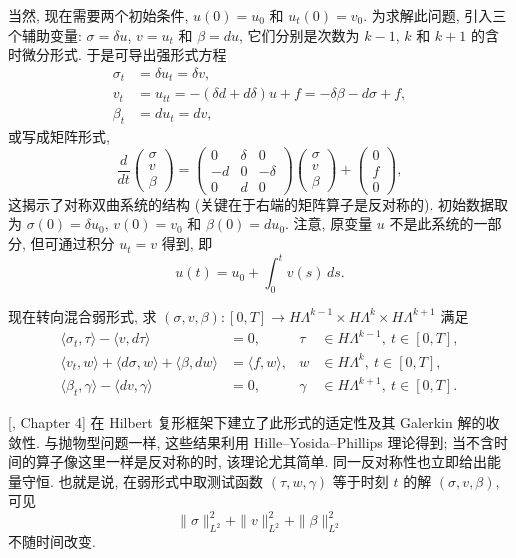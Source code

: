 当然, 现在需要两个初始条件, $u(0)=u_0$ 和 $u_t(0)=v_0$. 为求解此问题, 引入三个辅助变量: $\sigma=\delta u$, $v=u_t$ 和 $\beta=du$, 它们分别是次数为 $k-1$, $k$ 和 $k+1$ 的含时微分形式. 于是可导出强形式方程
\[
\begin{aligned}
\sigma_t&=\delta u_t=\delta v,\\
v_t&=u_{tt}=-(\delta d+d\delta)u+f=-\delta\beta-d\sigma+f,\\
\beta_t&=du_t=dv,
\end{aligned}
\]
或写成矩阵形式,
\[
\frac d{dt}\begin{pmatrix}\sigma\\v\\\beta\end{pmatrix}=
\begin{pmatrix}0&\delta&0\\-d&0&-\delta\\0&d&0\end{pmatrix}
\begin{pmatrix}\sigma\\v\\\beta\end{pmatrix}+\begin{pmatrix}0\\f\\0\end{pmatrix},
\]
这揭示了对称双曲系统的结构 (关键在于右端的矩阵算子是反对称的). 初始数据取为 $\sigma(0)=\delta u_0$, $v(0)=v_0$ 和 $\beta(0)=du_0$. 注意, 原变量 $u$ 不是此系统的一部分, 但可通过积分 $u_t=v$ 得到, 即
\[
u(t)=u_0+\int_0^t v(s)\,ds.
\]

现在转向混合弱形式, 求 $(\sigma,v,\beta):[0,T]\to H\Lambda^{k-1}\times H\Lambda^k\times H\Lambda^{k+1}$ 满足
\begin{equation}\label{eq:hodge-wave-weak-formulation}
\begin{aligned}
\langle\sigma_t,\tau\rangle-\langle v,d\tau\rangle&=0,&\tau&\in H\Lambda^{k-1},\ t\in[0,T],\\
\langle v_t,w\rangle+\langle d\sigma,w\rangle+\langle\beta,dw\rangle&=\langle f,w\rangle,&w&\in H\Lambda^k,\ t\in[0,T],\\
\langle\beta_t,\gamma\rangle-\langle dv,\gamma\rangle&=0,&\gamma&\in H\Lambda^{k+1},\ t\in[0,T].
\end{aligned}
\end{equation}

[, Chapter 4] 在 Hilbert 复形框架下建立了此形式的适定性及其 Galerkin 解的收敛性. 与抛物型问题一样, 这些结果利用 Hille–Yosida–Phillips 理论得到; 当不含时间的算子像这里一样是反对称的时, 该理论尤其简单. 同一反对称性也立即给出能量守恒. 也就是说, 在弱形式中取测试函数 $(\tau,w,\gamma)$ 等于时刻 $t$ 的解 $(\sigma,v,\beta)$, 可见
\[
\|\sigma\|_{L^2}^2+\|v\|_{L^2}^2+\|\beta\|_{L^2}^2
\]
不随时间改变.
